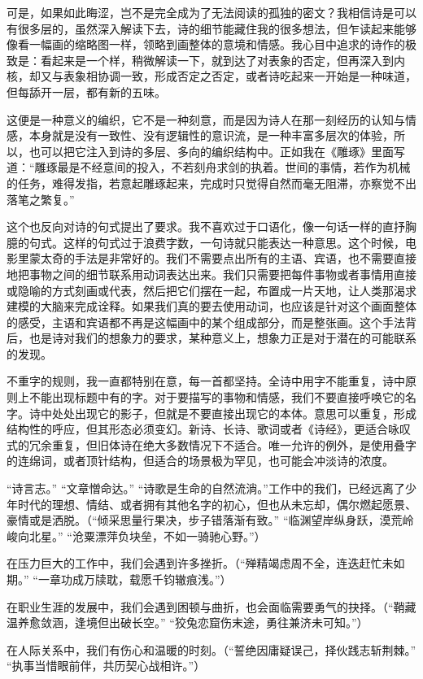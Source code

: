 \documentclass{article}
\begin{document}
可是，如果如此晦涩，岂不是完全成为了无法阅读的孤独的密文？我相信诗是可以有很多层的，虽然深入解读下去，诗的细节能藏住我的很多想法，但乍读起来能够像看一幅画的缩略图一样，领略到画整体的意境和情感。我心目中追求的诗作的极致是：看起来是一个样，稍微解读一下，就到达了对表象的否定，但再深入到内核，却又与表象相协调一致，形成否定之否定，或者诗吃起来一开始是一种味道，但每舔开一层，都有新的五味。

这便是一种意义的编织，它不是一种刻意，而是因为诗人在那一刻经历的认知与情感，本身就是没有一致性、没有逻辑性的意识流，是一种丰富多层次的体验，所以，也可以把它注入到诗的多层、多向的编织结构中。正如我在《雕琢》里面写道：``雕琢最是不经意间的投入，不若刻舟求剑的执着。世间的事情，若作为机械的任务，难得发指，若意起雕琢起来，完成时只觉得自然而毫无阻滞，亦察觉不出落笔之繁复。''

这个也反向对诗的句式提出了要求。我不喜欢过于口语化，像一句话一样的直抒胸臆的句式。这样的句式过于浪费字数，一句诗就只能表达一种意思。这个时候，电影里蒙太奇的手法是非常好的。我们不需要点出所有的主语、宾语，也不需要直接地把事物之间的细节联系用动词表达出来。我们只需要把每件事物或者事情用直接或隐喻的方式刻画或代表，然后把它们摆在一起，布置成一片天地，让人类那渴求建模的大脑来完成诠释。如果我们真的要去使用动词，也应该是针对这个画面整体的感受，主语和宾语都不再是这幅画中的某个组成部分，而是整张画。这个手法背后，也是诗对我们的想象力的要求，某种意义上，想象力正是对于潜在的可能联系的发现。

不重字的规则，我一直都特别在意，每一首都坚持。全诗中用字不能重复，诗中原则上不能出现标题中有的字。对于要描写的事物和情感，我们不要直接呼唤它的名字。诗中处处出现它的影子，但就是不要直接出现它的本体。意思可以重复，形成结构性的呼应，但其形态必须变幻。新诗、长诗、歌词或者《诗经》，更适合咏叹式的冗余重复，但旧体诗在绝大多数情况下不适合。唯一允许的例外，是使用叠字的连绵词，或者顶针结构，但适合的场景极为罕见，也可能会冲淡诗的浓度。

“诗言志。” “文章憎命达。” “诗歌是生命的自然流淌。”工作中的我们，已经远离了少年时代的理想、情结、或者拥有其他名字的初心，但也从未忘却，偶尔燃起愿景、豪情或是洒脱。（“倾采思量行果决，步子错落渐有致。” “临渊望岸纵身跃，漠荒岭峻向北星。” “沧粟漂萍负块垒，不如一骑驰心野。”）

在压力巨大的工作中，我们会遇到许多挫折。（“殚精竭虑周不全，连迭赶忙未如期。” “一章功成万牍耽，载愿千钧辙痕浅。”）

在职业生涯的发展中，我们会遇到困顿与曲折，也会面临需要勇气的抉择。（“鞘藏温养愈敛涵，逢境但出破长空。” “狡兔恋窟伤末途，勇往兼济未可知。”）

在人际关系中，我们有伤心和温暖的时刻。（“誓绝因庸疑误己，择伙践志斩荆棘。” “执事当惜眼前伴，共历契心战相许。”）
\end{document}

